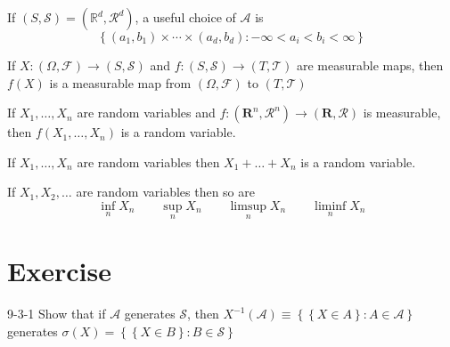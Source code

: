 \documentclass[../main.tex]{subfiles}
\begin{document}
\begin{example}{}{}
    If \(  \left( S,\mathcal{S} \right)= \left( \mathbb{R}^{d},\mathcal{R}^{d} \right)    \), a useful choice of \(  \mathcal{A}  \) is \[
    \left\{ \left( a_1,b_1 \right)\times \cdots \times \left( a_{d},b_{d} \right):-\infty< a_{i}< b_{i}< \infty   \right\}
    \]  
\end{example}
\begin{theorem}{}
If $X : (\Omega, \mathcal{F}) \to (S, \mathcal{S})$ and $f : (S, \mathcal{S}) \to (T, \mathcal{T})$ are measurable maps, then $f(X)$ is a measurable map from $(\Omega, \mathcal{F})$ to $(T, \mathcal{T})$
\end{theorem}
\begin{theorem}{}
If $X_1, \dots, X_n$ are random variables and $f : (\mathbf{R}^n, \mathcal{R}^n) \to (\mathbf{R}, \mathcal{R})$ is measurable, then $f(X_1, \dots, X_n)$ is a random variable.
\end{theorem}
\begin{theorem}{}
If $X_1,\dots,X_n$ are random variables then $X_1+\dots+X_n$ is a random variable.
\end{theorem}
\begin{theorem}{}
If $X_1, X_2, \dots$ are random variables then so are
\[ \inf_n X_n \qquad \sup_n X_n \qquad \limsup_n X_n \qquad \liminf_n X_n \]
\end{theorem}

\section*{Exercise}

\begin{exercise}{}{9-3-1}
    Show that if \(  \mathcal{A}  \) generates \(  \mathcal{S}  \), then \(  X ^{-1} \left( \mathcal{A} \right)\equiv \left\{ \left\{ X \in A \right\}: A\in \mathcal{A} \right\}   \) generates \(   \sigma \left( X \right)= \left\{ \left\{ X \in B \right\}:B \in \mathcal{S} \right\}   \)    
\end{exercise}
\end{document}
